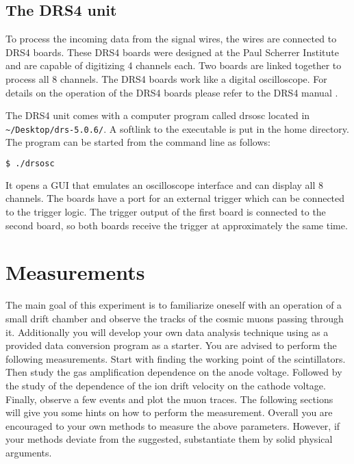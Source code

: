\documentclass[12pt]{article}
\begin{document}


\subsection{The DRS4 unit}
To process the incoming data from the signal wires, the wires are connected to DRS4 boards. These DRS4 boards were designed at the Paul Scherrer Institute and are capable of digitizing 4 channels each. Two boards are linked together to process all 8 channels. The DRS4 boards work like a digital oscilloscope. For details on the operation of the DRS4 boards please refer to the DRS4 manual \cite{DRS4_manual}.

The DRS4 unit comes with a computer program called drsosc located in \verb|~/Desktop/drs-5.0.6/|. A softlink to the executable is put in the home directory. The program can be started from the command line as follows: 

\begin{lstlisting}[language=bash]
$ ./drsosc
\end{lstlisting}

 It opens a GUI that emulates an oscilloscope interface and can display all 8 channels. The boards have a port for an external trigger which can be connected to the trigger logic. The trigger output of the first board is connected to the second board, so both boards receive the trigger at approximately the same time.

\section{Measurements}
The main goal of this experiment is to familiarize oneself with an operation of a small drift chamber and observe the tracks of the cosmic muons passing through it. Additionally you will develop your own data analysis technique using as a provided data conversion program as a starter.  You are advised to  perform the following measurements. Start with finding the  working point of the scintillators. Then study the gas amplification dependence on the anode voltage. Followed by the study of the dependence of the ion drift velocity on the cathode voltage. Finally, observe a few events and plot the muon traces. The following sections will give you some hints on how to perform the measurement. Overall you are encouraged to your own methods to measure the above parameters. However, if your methods deviate from the suggested, substantiate them by solid physical arguments. 
\end{document}
